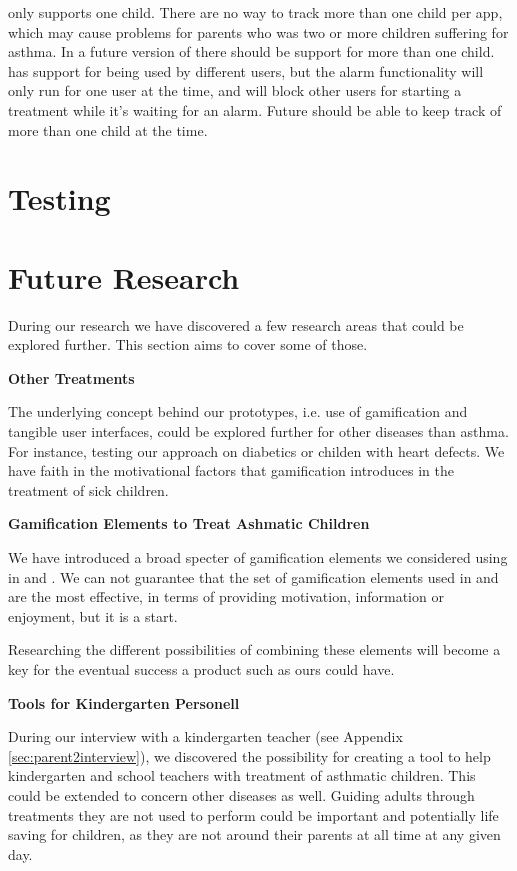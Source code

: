 \app{} only supports one child. There are no way to track more than one child per app, which may cause problems for parents who was two or more children suffering for asthma. In a future version of \app{} there should be support for more than one child. \ab{} has support for being used by different users, but the alarm functionality will only run for one user at the time, and will block other users for starting a treatment while it's waiting for an alarm. Future \ab{} should be able to keep track of more than one child at the time. 


\section{Testing}



\section{Future Research}

During our research we have discovered a few research areas that could be explored further. This section aims to cover some of those. 

\textbf{Other Treatments}

The underlying concept behind our prototypes, i.e. use of gamification and tangible user interfaces, could be explored further for other diseases than asthma. For instance, testing our approach on diabetics or childen with heart defects. We have faith in the motivational factors that gamification introduces in the treatment of sick children. 

\textbf{Gamification Elements to Treat Ashmatic Children}

We have introduced a broad specter of gamification elements we considered using in \app{} and \ab{}. We can not guarantee that the set of gamification elements used in \app{} and \ab{} are the most effective, in terms of providing motivation, information or enjoyment, but it is a start. 

Researching the different possibilities of combining these elements will become a key for the eventual success a product such as ours could have.    


\textbf{Tools for Kindergarten Personell}

During our interview with a kindergarten teacher (see Appendix \ref{sec:parent2interview}), we discovered the possibility for creating a tool to help kindergarten and school teachers with treatment of asthmatic children. This could be extended to concern other diseases as well. Guiding adults through treatments they are not used to perform could be important and potentially life saving for children, as they are not around their parents at all time at any given day.    

